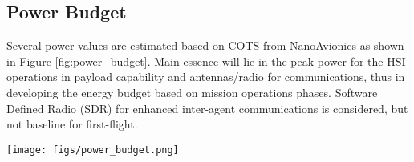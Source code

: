 \subsection{Power Budget}
Several power values are estimated based on COTS from NanoAvionics as shown in Figure \ref{fig:power_budget}. Main essence will lie in the peak power for the HSI operations in payload capability and antennas/radio for communications, thus in developing the energy budget based on mission operations phases. Software Defined Radio (SDR) for enhanced inter-agent communications is considered, but not baseline for first-flight.
\begin{figure*}[htbp]
	\centering
	\texttt{[image: figs/power\_budget.png]}
	\caption{Power Budget in Watts (W)}
	\label{fig:power_budget}
\end{figure*}
